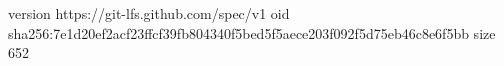 version https://git-lfs.github.com/spec/v1
oid sha256:7e1d20ef2acf23ffcf39fb804340f5bed5f5aece203f092f5d75eb46c8e6f5bb
size 652
